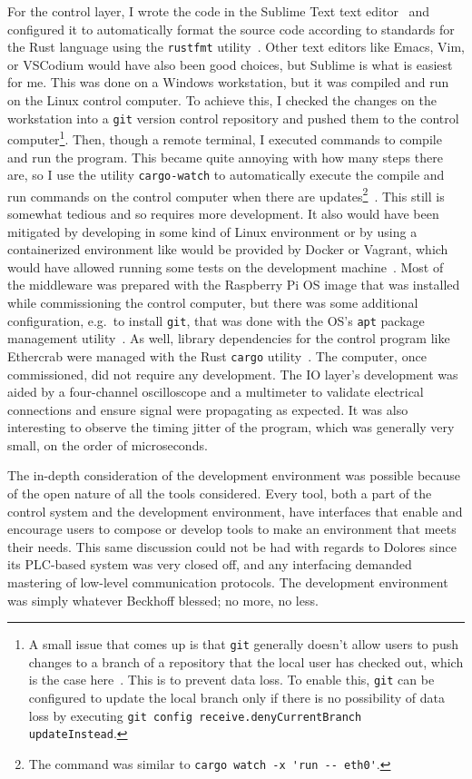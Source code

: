 \documentclass[english,12pt,a4paper,pdftex,eng,utf8]{aaltothesis}
\begin{document}
For the control layer, I wrote the code in the Sublime Text text editor~\cite{SublimeText} and configured it to automatically format the source code according to standards for the Rust language using the \verb|rustfmt| utility~\cite{rustfmt}.  Other text editors like Emacs, Vim, or VSCodium would have also been good choices, but Sublime is what is easiest for me.  This was done on a Windows workstation, but it was compiled and run on the Linux control computer.  To achieve this, I checked the changes on the workstation into a \verb|git| version control repository and pushed them to the control computer\footnote{A small issue that comes up is that \verb|git| generally doesn't allow users to push changes to a branch of a repository that the local user has checked out, which is the case here~\cite{GitConfigReceiveDenyCurrentBranch}.  This is to prevent data loss.  To enable this, \verb|git| can be configured to update the local branch only if there is no possibility of data loss by executing \verb|git config receive.denyCurrentBranch updateInstead|.}.  Then, though a remote terminal, I executed commands to compile and run the program.  This became quite annoying with how many steps there are, so I use the utility \verb|cargo-watch| to automatically execute the compile and run commands on the control computer when there are updates\footnote{The command was similar to \verb|cargo watch -x 'run -- eth0'|.}~\cite{CargoWatch}.  This still is somewhat tedious and so requires more development.  It also would have been mitigated by developing in some kind of Linux environment or by using a containerized environment like would be provided by Docker or Vagrant, which would have allowed running some tests on the development machine~\cite{DockerDev,VagrantDev}.  Most of the middleware was prepared with the Raspberry Pi OS image that was installed while commissioning the control computer, but there was some additional configuration, e.g.\ to install \verb|git|, that was done with the OS's \verb|apt| package management utility~\cite{apt}.  As well, library dependencies for the control program like Ethercrab were managed with the Rust \verb|cargo| utility~\cite{Cargo}.  The computer, once commissioned, did not require any development.  The IO layer's development was aided by a four-channel oscilloscope and a multimeter to validate electrical connections and ensure signal were propagating as expected.  It was also interesting to observe the timing jitter of the program, which was generally very small, on the order of microseconds.

The in-depth consideration of the development environment was possible because of the open nature of all the tools considered.  Every tool, both a part of the control system and the development environment, have interfaces that enable and encourage users to compose or develop tools to make an environment that meets their needs.  This same discussion could not be had with regards to Dolores since its PLC-based system was very closed off, and any interfacing demanded mastering of low-level communication protocols.  The development environment was simply whatever Beckhoff blessed; no more, no less.
\end{document}
